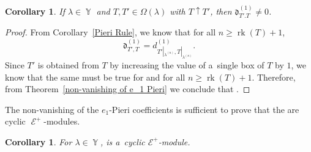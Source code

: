 \documentclass[pdftex]{sigma}
\numberwithin{equation}{section}
\newtheorem{Corollary}[Theorem]{Corollary}
\theoremstyle{definition}
\DeclareMathOperator{\Par}{\mathbb{Y}}
\DeclareMathOperator{\sE}{\mathcal{E}}
\DeclareMathOperator{\rk}{\mathrm{rk}}
\begin{document}
\begin{Corollary}\label{non-vanishing of e_1 Pieri for limit MacD}
 If $\lambda \in \Par$ and $T,T' \in \Omega(\lambda)$ with $T\uparrow T'$, then $\mathfrak{d}_{T'.T}^{(1)} \neq 0$.
\end{Corollary}

\begin{proof}
 From Corollary~\ref{Pieri Rule}, we know that for all $n \geq \rk(T)+1$,
 \[
 \mathfrak{d}_{T',T}^{(1)} = d_{T'|_{\lambda^{(n)}},T|_{\lambda^{(n)}}}^{(1)}.
 \]
 Since $T'$ is obtained from $T$ by increasing the value of a~single box of $T$ by $1$, we know that the same must be true for  and  for all $n \geq \rk(T)+1$. Therefore, from Theorem~\ref{non-vanishing of e_1 Pieri} we conclude that .
\end{proof}

The non-vanishing of the $e_1$-Pieri coefficients is sufficient to prove that the  are cyclic $\sE^{+}$-modules.

\begin{Corollary}\label{Murnaghan type modules are cyclic +EHA reps}
 For $\lambda \in \Par$,  is a~cyclic $\mathcal{E}^{+}$-module.
\end{Corollary}
\end{document}
